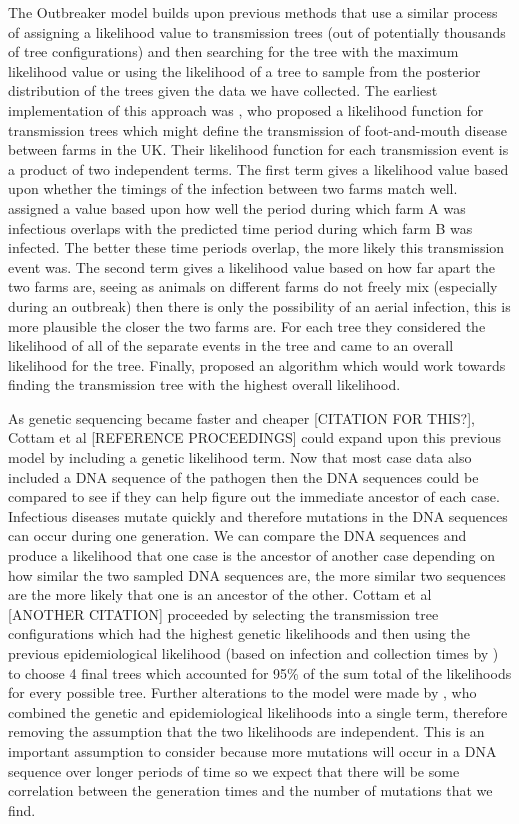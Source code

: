 \documentclass[11pt,a4paper]{report}
\begin{document}
The Outbreaker model builds upon previous methods that use a similar process of assigning a likelihood value to transmission trees (out of potentially thousands of tree configurations) and then searching for the tree with the maximum likelihood value or using the likelihood of a tree to sample from the posterior distribution of the trees given the data we have collected. The earliest implementation of this approach was \citet{Haydon03}, who proposed a likelihood function for transmission trees which might define the transmission of foot-and-mouth disease between farms in the UK. Their likelihood function for each transmission event is a product of two independent terms. The first term gives a likelihood value based upon whether the timings of the infection between two farms match well. \citet{Haydon03} assigned a value based upon how well the period during which farm A was infectious overlaps with the predicted time period during which farm B was infected. The better these time periods overlap, the more likely this transmission event was. The second term gives a likelihood value based on how far apart the two farms are, seeing as animals on different farms do not freely mix (especially during an outbreak) then there is only the possibility of an aerial infection, this is more plausible the closer the two farms are. For each tree they considered the likelihood of all of the separate events in the tree and came to an overall likelihood for the tree. Finally, \citet{Haydon03} proposed an algorithm which would work towards finding the transmission tree with the highest overall likelihood.

As genetic sequencing became faster and cheaper [CITATION FOR THIS?], Cottam et al [REFERENCE PROCEEDINGS] could expand upon this previous model by including a genetic likelihood term. Now that most case data also included a DNA sequence of the pathogen then the DNA sequences could be compared to see if they can help figure out the immediate ancestor of each case. Infectious diseases mutate quickly and therefore mutations in the DNA sequences can occur during one generation. We can compare the DNA sequences and produce a likelihood that one case is the ancestor of another case depending on how similar the two sampled DNA sequences are, the more similar two sequences are the more likely that one is an ancestor of the other. Cottam et al [ANOTHER CITATION] proceeded by selecting the transmission tree configurations which had the highest genetic likelihoods and then using the previous epidemiological likelihood (based on infection and collection times by \citet{Haydon03}) to choose 4 final trees which accounted for 95\% of the sum total of the likelihoods for every possible tree. Further alterations to the model were made by \citet{Ypma13}, who combined the genetic and epidemiological likelihoods into a single term, therefore removing the assumption that the two likelihoods are independent. This is an important assumption to consider because more mutations will occur in a DNA sequence over longer periods of time so we expect that there will be some correlation between the generation times and the number of mutations that we find.
\end{document}
